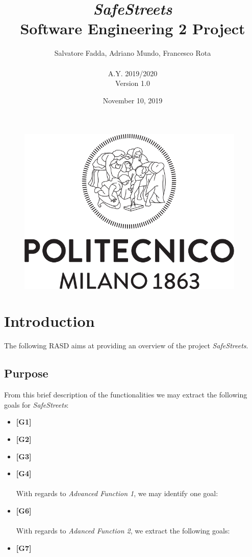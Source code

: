 \documentclass {article}
\begin{document}
\begin{figure}
\centering
	\includegraphics[height=8cm]{polimi_logo.png}
\end{figure}


\title {{\Huge \it SafeStreets} \\ \Large Software Engineering 2 Project}
\author{Salvatore Fadda, Adriano Mundo, Francesco Rota
		\\ \\ A.Y. 2019/2020 \\ Version 1.0}
\date{November 10, 2019}


\maketitle
\newpage

	
\tableofcontents
\newpage


\section{Introduction}
The following RASD aims at providing an overview of the project {\it SafeStreets}. 

	
	\subsection{Purpose}

From this brief description of the functionalities we may extract the following goals for {\it SafeStreets}: 
		
		\begin{itemize} %

   			 \item {\bf [G1]} 			
			 \item {\bf [G2]} 
   			 \item {\bf [G3]}    			  
   			 \item {\bf [G4]} 
   			 \\
			 \\
With regards to {\it {\it Advanced Function 1}}, we may identify one goal: 
   			 \item {\bf [G6]}\\
			 \\
 With regards to {\it Adanced Function 2}, we extract the following goals:
			  \item {\bf [G7]} 			
			  \end{itemize}
			
\end{document}
